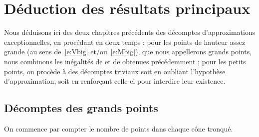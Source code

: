\chapter{Déduction des résultats principaux}
\label{chap:union}

Nous déduisons ici des deux chapitres précédents des décomptes
d'approximations exceptionnelles, en procédant en deux temps : pour les points
de hauteur assez grande (au sens de~\eqref{e:Vbig} et/ou~\eqref{e:Mbig}), que
nous appellerons grands points, nous combinons les inégalités de 
et de  obtenues précédemment ; pour les petits points, on procède
à des décomptes triviaux soit en oubliant l'hypothèse d'approximation, soit en
renforçant celle-ci pour interdire leur existence.

\section{Décomptes des grands points}
\label{sec:big-points}

On commence par compter le nombre de points dans chaque cône tronqué.

